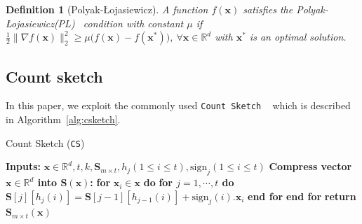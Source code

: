 \documentclass{article} %
\newcommand{\pl}{Polyak-\L{}ojasiewicz}
\newtheorem{definition}{Definition}
\begin{document}
\begin{definition}[\pl]\label{assum:pl}
A function $f(\boldsymbol{x})$ satisfies the \pl (PL)~ condition with constant $\mu$ if $\frac{1}{2}\|\nabla f(\boldsymbol{x})\|_2^2\geq \mu\big(f(\boldsymbol{x})-f(\boldsymbol{x}^*)\big),\: \forall \boldsymbol{x}\in\mathbb{R}^d $ with $\boldsymbol{x}^*$ is an optimal solution.
\end{definition}


\subsection{Count sketch}
 In this paper, we exploit the commonly used \texttt{Count Sketch} ~\citep{DBLP:journals/tcs/CharikarCF04} which is described in Algorithm~\ref{alg:csketch}.
 \begin{algorithm}[H]
\caption{Count Sketch ({\texttt{CS})~\citep{DBLP:journals/tcs/CharikarCF04}} }\label{alg:csketch}
 \begin{algorithmic}[1]
\STATE \textbf{Inputs:} $\boldsymbol{x}\in\mathbb{R}^{d}, t, k, \mathbf{S}_{m\times t}, h_j (1\leq i\leq t), \text{sign}_j (1\leq i\leq t)$
 \STATE \textbf{Compress vector $\boldsymbol{x}\in\mathbb{R}^{d}$ into $\mathbf{S}\left(\boldsymbol{x}\right)$:}
 \STATE \textbf{for} $\boldsymbol{x}_i\in\boldsymbol{x}$ \textbf{do}
 \STATE \quad\textbf{for $j=1,\cdots,t$ do}
 \STATE \quad\quad $\mathbf{S}[j][h_j(i)]=\mathbf{S}[j-1][h_{j-1}(i)]+\text{sign}_j(i).\boldsymbol{x}_i$ 
 \STATE \quad\textbf{end for}
 \STATE \textbf{end for}
 \STATE \textbf{return} $\mathbf{S}_{m\times t}(\boldsymbol{x})$
 \end{algorithmic}
 \end{algorithm}
\end{document}
